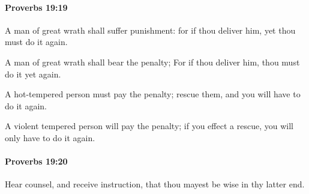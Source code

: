 		\paragraph{Proverbs 19:19} %
			\label{PROVERBS-19-19}

			A man of great wrath shall suffer punishment: for if thou deliver him, yet thou must do it again.

			\begin{versebox}
					\item[BHS] 
					\item[ASV] A man of great wrath shall bear the penalty; For if thou deliver him, thou must do it yet again.
					\item[NIV] A hot-tempered person must pay the penalty; rescue them, and you will have to do it again.
					\item[NRSV] A violent tempered person will pay the penalty; if you effect a rescue, you will only have to do it again.
			\end{versebox}

		\paragraph{Proverbs 19:20} %
			\label{PROVERBS-19-20}

			Hear counsel, and receive instruction, that thou mayest be wise in thy latter end.


